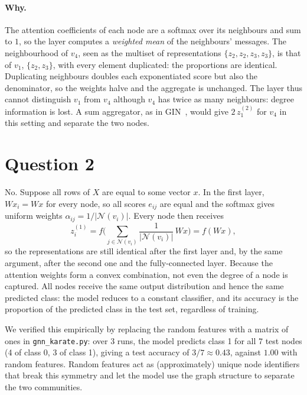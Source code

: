 \documentclass[a4paper]{article}
\begin{document}
\paragraph{Why.} The attention coefficients of each node are a softmax over its neighbours and sum to $1$, so the layer computes a \emph{weighted mean} of the neighbours' messages. The neighbourhood of $v_4$, seen as the multiset of representations $\{z_2, z_2, z_3, z_3\}$, is that of $v_1$, $\{z_2, z_3\}$, with every element duplicated: the proportions are identical. Duplicating neighbours doubles each exponentiated score but also the denominator, so the weights halve and the aggregate is unchanged. The layer thus cannot distinguish $v_1$ from $v_4$ although $v_4$ has twice as many neighbours: degree information is lost. A sum aggregator, as in GIN~\cite{xu2019powerful}, would give $2\,z_1^{(2)}$ for $v_4$ in this setting and separate the two nodes.


\section{Question 2}

No. Suppose all rows of $X$ are equal to some vector $x$. In the first layer, $W x_i = W x$ for every node, so all scores $e_{ij}$ are equal and the softmax gives uniform weights $\alpha_{ij} = 1/|\mathcal{N}(v_i)|$. Every node then receives
\begin{equation}
    z_i^{(1)} = f\Big(\sum_{j \in \mathcal{N}(v_i)} \frac{1}{|\mathcal{N}(v_i)|}\, W x\Big) = f(W x),
\end{equation}
so the representations are still identical after the first layer and, by the same argument, after the second one and the fully-connected layer. Because the attention weights form a convex combination, not even the degree of a node is captured. All nodes receive the same output distribution and hence the same predicted class: the model reduces to a constant classifier, and its accuracy is the proportion of the predicted class in the test set, regardless of training.

We verified this empirically by replacing the random features with a matrix of ones in \texttt{gnn\_karate.py}: over 3 runs, the model predicts class 1 for all 7 test nodes (4 of class 0, 3 of class 1), giving a test accuracy of $3/7 \approx 0.43$, against $1.00$ with random features. Random features act as (approximately) unique node identifiers that break this symmetry and let the model use the graph structure to separate the two communities.
\end{document}
